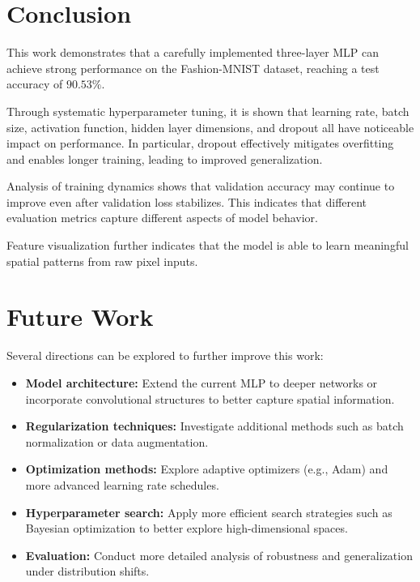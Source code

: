 \documentclass[11pt]{article}
\begin{document}
\section{Conclusion}

This work demonstrates that a carefully implemented three-layer MLP can achieve strong performance on the Fashion-MNIST dataset, reaching a test accuracy of $90.53\%$. 

Through systematic hyperparameter tuning, it is shown that learning rate, batch size, activation function, hidden layer dimensions, and dropout all have noticeable impact on performance. In particular, dropout effectively mitigates overfitting and enables longer training, leading to improved generalization.

Analysis of training dynamics shows that validation accuracy may continue to improve even after validation loss stabilizes. This indicates that different evaluation metrics capture different aspects of model behavior.

Feature visualization further indicates that the model is able to learn meaningful spatial patterns from raw pixel inputs.

\section{Future Work}

Several directions can be explored to further improve this work:

\begin{itemize}
    \item \textbf{Model architecture:} Extend the current MLP to deeper networks or incorporate convolutional structures to better capture spatial information.
    
    \item \textbf{Regularization techniques:} Investigate additional methods such as batch normalization or data augmentation.
    
    \item \textbf{Optimization methods:} Explore adaptive optimizers (e.g., Adam) and more advanced learning rate schedules.
    
    \item \textbf{Hyperparameter search:} Apply more efficient search strategies such as Bayesian optimization to better explore high-dimensional spaces.
    
    \item \textbf{Evaluation:} Conduct more detailed analysis of robustness and generalization under distribution shifts.
\end{itemize}
\end{document}
